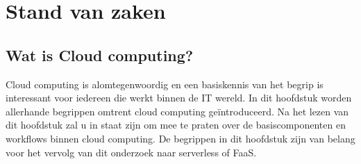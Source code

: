 \chapter{Stand van zaken}
\label{ch:stand-van-zaken}



%
%

\section{Wat is Cloud computing?}
 
 Cloud computing is alomtegenwoordig en een basiskennis van het begrip is interessant voor iedereen die werkt binnen de IT wereld. In dit hoofdstuk worden allerhande begrippen omtrent cloud computing geïntroduceerd. Na het lezen van dit hoofdstuk zal u in staat zijn om mee te praten over de basiscomponenten en workflows binnen cloud computing. De begrippen in dit hoofdstuk zijn van belang voor het vervolg van dit onderzoek naar serverless of FaaS. 

